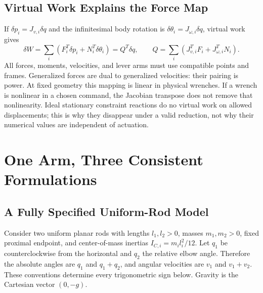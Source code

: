 \subsection{Virtual Work Explains the Force Map}

If $\delta p_i=J_{v,i}\delta q$ and the infinitesimal body rotation is $\delta\theta_i=J_{\omega,i}\delta q$, virtual work gives
\begin{equation}
\delta W=\sum_i(F_i^T\delta p_i+N_i^T\delta\theta_i)
 =Q^T\delta q,\qquad
Q=\sum_i(J_{v,i}^TF_i+J_{\omega,i}^TN_i).
\label{eq:ch3:generalized-force-def}
\end{equation}
All forces, moments, velocities, and lever arms must use compatible points and frames. Generalized forces are dual to generalized velocities: their pairing is power. At fixed geometry this mapping is linear in physical wrenches. If a wrench is nonlinear in a chosen command, the Jacobian transpose does not remove that nonlinearity. Ideal stationary constraint reactions do no virtual work on allowed displacements; this is why they disappear under a valid reduction, not why their numerical values are independent of actuation.

\section{One Arm, Three Consistent Formulations}

\subsection{A Fully Specified Uniform-Rod Model}

Consider two uniform planar rods with lengths $l_1,l_2>0$, masses $m_1,m_2>0$, fixed proximal endpoint, and center-of-mass inertias $I_{C,i}=m_il_i^2/12$. Let $q_1$ be counterclockwise from the horizontal and $q_2$ the relative elbow angle. Therefore the absolute angles are $q_1$ and $q_1+q_2$, and angular velocities are $v_1$ and $v_1+v_2$. These conventions determine every trigonometric sign below. Gravity is the Cartesian vector $(0,-g)$.

